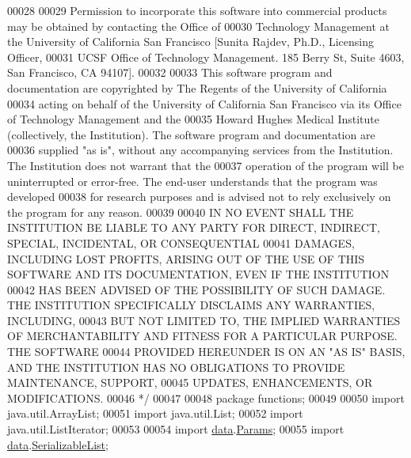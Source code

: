 \begin{DoxyCode}
00028 \textcolor{comment}{}
00029 \textcolor{comment}{Permission to incorporate this software into commercial products may be obtained by contacting the Office
       of }
00030 \textcolor{comment}{Technology Management at the University of California San Francisco [Sunita Rajdev, Ph.D., Licensing
       Officer, }
00031 \textcolor{comment}{UCSF Office of Technology Management. 185 Berry St, Suite 4603, San Francisco, CA 94107].}
00032 \textcolor{comment}{}
00033 \textcolor{comment}{This software program and documentation are copyrighted by The Regents of the University of California }
00034 \textcolor{comment}{acting on behalf of the University of California San Francisco via its Office of Technology Management and
       the }
00035 \textcolor{comment}{Howard Hughes Medical Institute (collectively, the Institution).  The software program and documentation
       are }
00036 \textcolor{comment}{supplied "as is", without any accompanying services from the Institution. The Institution does not warrant
       that the }
00037 \textcolor{comment}{operation of the program will be uninterrupted or error-free. The end-user understands that the program was
       developed }
00038 \textcolor{comment}{for research purposes and is advised not to rely exclusively on the program for any reason.}
00039 \textcolor{comment}{}
00040 \textcolor{comment}{IN NO EVENT SHALL THE INSTITUTION BE LIABLE TO ANY PARTY FOR DIRECT, INDIRECT, SPECIAL, INCIDENTAL, OR
       CONSEQUENTIAL }
00041 \textcolor{comment}{DAMAGES, INCLUDING LOST PROFITS, ARISING OUT OF THE USE OF THIS SOFTWARE AND ITS DOCUMENTATION, EVEN IF THE
       INSTITUTION }
00042 \textcolor{comment}{HAS BEEN ADVISED OF THE POSSIBILITY OF SUCH DAMAGE. THE  INSTITUTION SPECIFICALLY DISCLAIMS ANY WARRANTIES,
       INCLUDING, }
00043 \textcolor{comment}{BUT NOT LIMITED TO, THE IMPLIED WARRANTIES OF MERCHANTABILITY AND FITNESS FOR A PARTICULAR PURPOSE. THE
       SOFTWARE }
00044 \textcolor{comment}{PROVIDED HEREUNDER IS ON AN "AS IS" BASIS, AND THE  INSTITUTION HAS NO OBLIGATIONS TO PROVIDE MAINTENANCE,
       SUPPORT, }
00045 \textcolor{comment}{UPDATES, ENHANCEMENTS, OR MODIFICATIONS.}
00046 \textcolor{comment}{*/}    
00047 
00048 \textcolor{keyword}{package }functions;
00049 
00050 \textcolor{keyword}{import} java.util.ArrayList;
00051 \textcolor{keyword}{import} java.util.List;
00052 \textcolor{keyword}{import} java.util.ListIterator;
00053 
00054 \textcolor{keyword}{import} \hyperlink{namespacedata}{data}.\hyperlink{classdata_1_1_params}{Params};
00055 \textcolor{keyword}{import} \hyperlink{namespacedata}{data}.\hyperlink{classdata_1_1_serializable_list}{SerializableList};

\end{DoxyCode}
